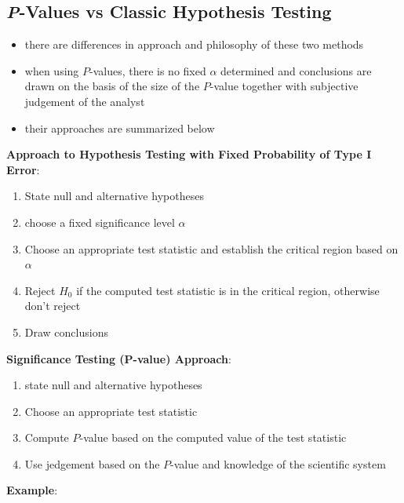 \documentclass[10pt]{article}
\begin{document}
\subsection{\textit{P}-Values vs Classic Hypothesis Testing}
\begin{itemize}
    \item there are differences in approach and philosophy of these two methods
    \item when using $P$-values, there is no fixed $\alpha$ determined and conclusions are drawn on the basis of the size of the $P$-value together with subjective judgement of the analyst
    \item their approaches are summarized below
\end{itemize}
\begin{theorem}
    \textbf{Approach to Hypothesis Testing with Fixed Probability of Type I Error}:
    \begin{enumerate}
        \item State null and alternative hypotheses 
        \item choose a fixed significance level $\alpha$ 
        \item Choose an appropriate test statistic and establish the critical region based on $\alpha$ 
        \item Reject $H_0$ if the computed test statistic is in the critical region, otherwise don't reject 
        \item Draw conclusions
    \end{enumerate}
\end{theorem}
\begin{theorem}
    \textbf{Significance Testing (P-value) Approach}:
    \begin{enumerate}
        \item state null and alternative hypotheses
        \item Choose an appropriate test statistic
        \item Compute $P$-value based on the computed value of the test statistic 
        \item Use jedgement based on the $P$-value and knowledge of the scientific system
    \end{enumerate}
\end{theorem}
\textbf{Example}:
\end{document}
